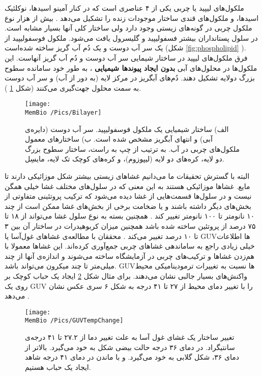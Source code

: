  
ملکول‌های لیپید یا چربی یکی از ۴ عناصری است که در کنار آمینو اسید‌ها، نوکلئیک اسید‌ها، و ملکول‌های قندی ساختار موجودات زنده را تشکیل می‌دهد
\cite{Membraneasamatteroffat}
.  بیش از هزار نوع ملکول چربی در گونه‌های زیستی وجود دارد ولی ساختار کلی آنها بسیار مشابه است. در سلول‌ پستانداران بیشتر فسفولیپید و گلیسرول یافت می‌شود. ملکول‌ فوسفولیپید از یک سر آب دوست
 و یک دُم آب گریز
 ساخته شده‌است (شکل
\ref{fig:phospholipid}
). فرق ملکول‌های لیپید در ساختار شیمایی سر آب دوست و دُم آب‌ گریز آنهاست. این ملکول‌ها در محلول‌های آبی
\textbf{بدون ایجاد پیوندها شیمیایی}
، به طور خود سامانده
 سطوح بزرگ دولایه تشکیل دهند.  دُم‌های  آبگریز در مرکز لایه (به دور از آب) و سر آب دوست به سمت محلول جهت‌گیری می‌کنند (شکل
\ref{fig:bilayer}
 ).
\begin{figure}[h]
\begin{center}
\texttt{[image: \\MemBio /Pics/Bilayer]}
\caption{
الف) ساختار شیمیایی یک ملکول فوسفولیپید. سر آب دوست (دایره‌ی آبی) و  انتهای آبگریز مشخص شده است. ب) ساختار‌های معمول ملکول‌های چربی در آب. به ترتیب از چپ به راست، ساختار سطوح بزرگ دو لایه، کره‌های دو لایه (لیپوزوم)، و کره‌های کوچک تک لایه، مایسِل.
}
\label{fig:bilayer}
\end{center}
\end{figure}
البته با گسترش تحقیقات ما می‌دانیم غشا‌های زیستی بیشتر شکل موزائیکی دارند تا مایع. غشاها موزائیکی هستند به این معنی که در سلول‌های مختلف غشا خیلی همگن نیست و در سلول‌ها قسمت‌هایی از غشا دیده‌ می‌شود که ترکیب پروتئینی متفاوتی از بخش‌های دیگر داشته باشند و یا ضخامت برخی از بخش‌های غشا ممکن است از چند ۱۰ نانومتر تا ۱۰۰ نانومتر تغییر کند
\cite{Engelman:2005aa}
. همچنین بسته به نوع سلول غشا می‌تواند از ۱۸ تا ۷۵ درصد از پروتئین ساخته شده باشد همچنین میزان کربوهیدرات در ساختار آن بین ۳ تا ۱۰ درصد تغییر می‌کند
\cite{MembraneProteins1972}
. محققان با مطالعه‌ی غشا‌های غول‌آسا
 یا 
 GUVها اطلاعات خیلی زیادی راجع به ساماندهی غشاهای چربی جمع‌آوری کرده‌اند. این غشا‌ها معمولا با هم‌زدن 
 غشا‌ها و ترکیب‌های چربی در آزمایشگاه ساخته می‌شوند
 \cite{GUVmaking2009}
و اندازه‌ی آنها از چند میلی‌متر تا چند میکرون می‌تواند باشد. 
GUVها نسبت به تغییرات ترمودینامیکی محیط واکنش‌های بسیار جالبی نشان می‌دهند. برای مثال شکل
\ref{fig:GUVTempChange}
ایجاد یک حباب کوچک بر روی یک GUV را با تغییر دمای محیط از ۲۷ تا ۴۱ درجه به شکل ۶ سری عکس نشان می‌دهد
\cite{MemReviewRamakrishnan2014}
.
 \begin{figure}[h]
\begin{center}
\texttt{[image: \\MemBio /Pics/GUVTempChange]}
\caption{
تغییر ساختار یک غشای غول ‌آسا به علت تغییر دما از ۲۷.۲ تا ۴۱ درجه‌ی سانتیگراد. در دمای ۳۶ درجه حالت بیضی شکل به خود می‌گیرد. بالاتر از دمای ۳۶، شکل گلابی به خود می‌گیرد. و با ماندن در دمای ۴۱ درجه شاهد ایجاد یک حباب هستیم.
}
\label{fig:GUVTempChange}
\end{center}
\end{figure}
